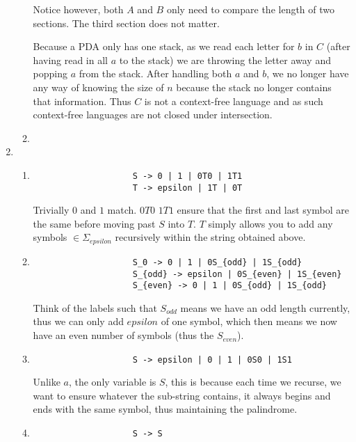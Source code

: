 \documentclass{article}
\begin{document}
\begin{enumerate}
\begin{enumerate}
                Notice however, both $A$ and $B$ only need to compare the length of two sections.
                The third section does not matter.

                Because a PDA only has one stack, as we read each letter for $b$ in $C$ (after having read in all $a$ to the stack) we are throwing the letter away and popping $a$ from the stack.
                After handling both $a$ and $b$, we no longer have any way of knowing the size of $n$ because the stack no longer contains that information.
                Thus $C$ is not a context-free language and as such context-free languages are not closed under intersection.
            \item
        \end{enumerate}
    \item %
        \begin{enumerate}
            \item
                \begin{lstlisting}
                    S -> 0 | 1 | 0T0 | 1T1
                    T -> epsilon | 1T | 0T
                \end{lstlisting}

                Trivially $0$ and $1$ match.
                $0T0$ $1T1$ ensure that the first and last symbol are the same before moving past $S$ into $T$.
                $T$ simply allows you to add any symbols $\in \Sigma_{epsilon}$ recursively within the string obtained above.
            \item
                \begin{lstlisting}
                    S_0 -> 0 | 1 | 0S_{odd} | 1S_{odd}
                    S_{odd} -> epsilon | 0S_{even} | 1S_{even}
                    S_{even} -> 0 | 1 | 0S_{odd} | 1S_{odd}
                \end{lstlisting}

                Think of the labels such that $S_{odd}$ means we have an odd length currently, thus we can only add $epsilon$ of one symbol, which then means we now have an even number of symbols (thus the $S_{even}$).
            \item
                \begin{lstlisting}
                    S -> epsilon | 0 | 1 | 0S0 | 1S1
                \end{lstlisting}

                Unlike $a$, the only variable is $S$, this is because each time we recurse, we want to ensure whatever the sub-string contains, it always begins and ends with the same symbol, thus maintaining the palindrome.
            \item
                \begin{lstlisting}
                    S -> S
                \end{lstlisting}


\end{enumerate}
\end{enumerate}
\end{document}
